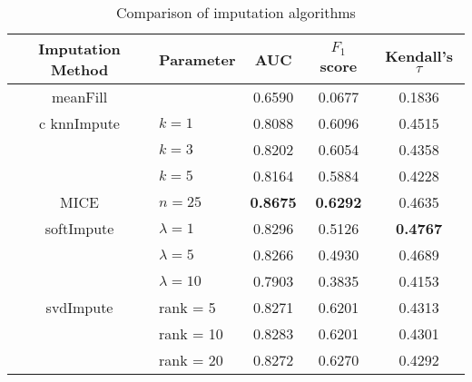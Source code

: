 \begin{table}[htbp]
\centering
\begin{tabular}{cl||ccc}
\toprule
Imputation Method & Parameter & AUC & $F_1$ score & Kendall's $\tau$ \\
\midrule 
meanFill &   & 0.6590  & 0.0677 & 0.1836 \\
\midrule c
knnImpute & $k = 1$ & 0.8088 & 0.6096 & 0.4515\\
  & $k = 3$ & 0.8202 & 0.6054 & 0.4358 \\
  & $k = 5$ & 0.8164 & 0.5884 & 0.4228 \\
\midrule
MICE & $n = 25$ & \bf{0.8675} & \bf{0.6292} & 0.4635 \\
\midrule
softImpute & $\lambda=1$ & 0.8296 & 0.5126 & \bf{0.4767} \\
& $\lambda=5$ & 0.8266 & 0.4930 & 0.4689 \\
& $\lambda=10$ & 0.7903 & 0.3835 & 0.4153 \\
\midrule
svdImpute & rank = 5 & 0.8271 & 0.6201 & 0.4313 \\
& rank = 10 & 0.8283 & 0.6201 & 0.4301 \\
& rank = 20 & 0.8272 & 0.6270 & 0.4292  \\
\bottomrule[1.25pt]
\end{tabular}
\begin{center}
\caption{Comparison of imputation algorithms} \label{tab:imputation}
\end{center}
\end{table}

